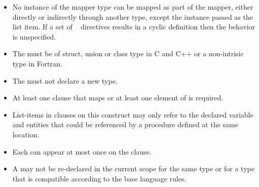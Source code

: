 \begin{itemize}

\item No instance of the mapper type can be mapped as part of the mapper, either
  directly or indirectly through another type, except the instance passed as the
  list item. If a set of ~ directives results in a
  cyclic definition then the behavior is unspecified.

\item The  must be of struct, union or class type in C and C++ or a
  non-intrisic type in Fortran.

\item The  must not declare a new type.

\item At least one  clause that maps  or at least one element
  of  is required.

\item List-items in  clauses on this construct may only refer to the
  declared variable  and entities that could be referenced by a
  procedure defined at the same location.

\item Each  can appear at most once on the
    clause.

 \item A  may not be re-declared in the current scope for
   the same type or for a type that is compatible according to the base language
   rules.

\end{itemize}
